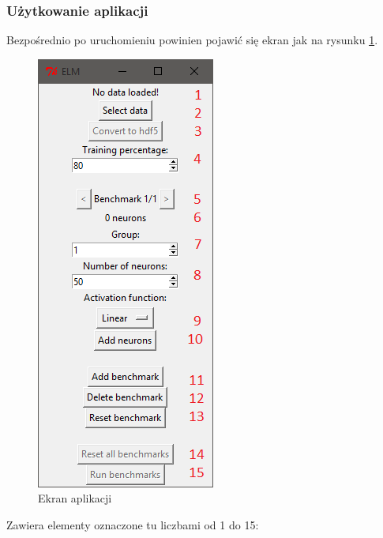 \documentclass{article}
\begin{document}
\subsubsection*{Użytkowanie aplikacji}
Bezpośrednio po uruchomieniu powinien pojawić się ekran jak na rysunku \ref{python_ekran}.
\begin{figure}[H]
\centering
\includegraphics{instrukcja_python_start.png}
\caption{Ekran aplikacji}
\label{python_ekran}
\end{figure}
Zawiera elementy oznaczone tu liczbami od 1 do 15:
\end{document}
